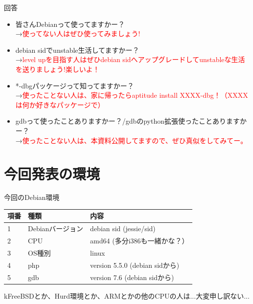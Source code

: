 \begin{frame}{回答}

\begin {itemize}[<+->]
\item 皆さんDebianって使ってますかー？\\
→\textcolor{red}{使ってない人はぜひ使ってみましょう!}
\item debian sidでunstable生活してますかー？\\
→\textcolor{red}{level upを目指す人はぜひdebian sidへアップグレードしてunstableな生活を送りましょう!楽しいよ！}
\item *-dbgパッケージって知ってますかー？\\
→\textcolor{red}{使ったことない人は、家に帰ったらaptitude install XXXX-dbg！（XXXXは何か好きなパッケージで）}
\item gdbって使ったことありますかー？/gdbのpython拡張使ったことありますかー？\\
→\textcolor{red}{使ったことない人は、本資料公開してますので、ぜひ真似をしてみてー。}
\end{itemize}

\end{frame}

\section{今回発表の環境}

\begin{frame}{今回のDebian環境}

\begin{table}[htb]
\begin{tabular}{|l|l|l|} \hline
項番 & 種類 & 内容 \\ \hline 
1 & Debianバージョン & debian sid (jessie/sid) \\ \hline
2 & CPU & amd64 (多分i386も一緒かな？）\\ \hline
3 & OS種別 & linux \\ \hline
4 & php & version 5.5.0 (debian sidから)\\ \hline
5 & gdb & version 7.6 (debian sidから)\\ \hline
\end{tabular}
\end{table}  

 kFreeBSDとか、Hurd環境とか、ARMとかの他のCPUの人は...大変申し訳ない...

\end{frame}

